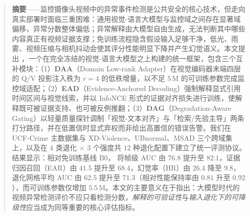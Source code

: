 \begin{abstract}

\vspace{0.6em}
\noindent\textbf{摘要}——监控摄像头视频中的异常事件检测是公共安全的核心技术，但走向真实部署时面临三重困难：通用视觉-语言大模型与监控域之间存在显著域偏移，异常分数整体偏低；异常解释由大模型自由生成，无法判断其中哪些内容真正有视频证据支撑；免训练流程隐含假设输入足够干净，低光、雨雾、视频压缩与相机抖动会使其评分性能明显下降并产生幻觉语义。本文提出 \evivad{}，一个在完全冻结的视觉-语言大模型之上构建的统一框架，包含三个互补模块：（1）\textbf{DAA}（Domain Low-rank Adapter）在视觉编码器末端四层的 Q/V 投影注入秩为 $r{=}4$ 的低秩增量，以不足 $5$\,M 的可训练参数完成监控域适配；（2）\textbf{EAD}（Evidence-Anchored Decoding）强制解释显式引用时间区间与视觉线索，并以 InfoNCE 形式的证据对齐损失进行训练，使解释既可被证据支持、也可被反例推翻；（3）\textbf{DAG}（Degradation-Aware Gating）以轻量质量探针调制「视觉-文本对齐」与「检索/先验主导」两条打分路径，并在低置信时显式弃权而非给出高置信的错误告警。我们在 UCF-Crime 主数据集与 XD-Violence、UBnormal、MSAD 三个跨域集上，以及在 $4$ 类退化 $\times$ $3$ 个强度共 $12$ 种退化配置下建立了统一评测协议。结果显示：相对免训练基线 B0，\evivad{} 将帧级 AUC 由 $76.8$ 提升至 $82.1$，证据归因召回（EAR）由 $41.5$ 提升至 $68.4$，幻觉率（HR）由 $26.4$ 降至 $9.8$，退化网格平均 AUC 由 $62.5$ 提升至 $71.3$（相对性能保持率由 $0.81$ 升至 $0.92$），而可训练参数仅增加 $5.5$\,M。本文的主要意义在于指出：大模型时代的视频异常检测评价不应只看检测分数，\emph{解释的可验证性}与\emph{输入退化下的可降级性}应当成为同等重要的核心评估指标。


\end{abstract}
